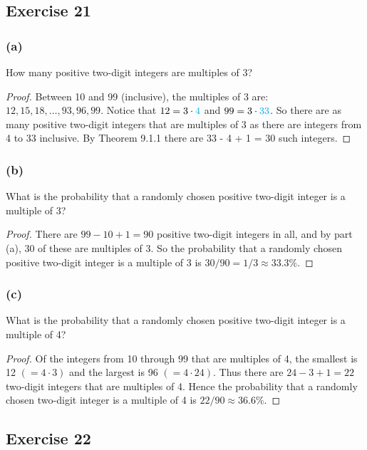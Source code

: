 \documentclass[14pt]{extarticle}
\newcommand{\cy}{\color{cyan}}
\begin{document}
\subsection{Exercise 21}
\subsubsection{(a)}
How many positive two-digit integers are multiples of 3?

\begin{proof}
Between 10 and 99 (inclusive), the multiples of 3 are: \(12, 15, 18, \ldots, 93, 96, 99\). Notice that
\(12 = 3 \cdot {\cy 4}\) and \(99 = 3 \cdot {\cy 33}\). So there are as many positive two-digit integers that are 
multiples of 3 as there are integers from 4 to 33 inclusive. By Theorem 9.1.1 there are 33 - 4 + 1 = 30 such
integers.
\end{proof}

\subsubsection{(b)}
What is the probability that a randomly chosen positive two-digit integer is a multiple of 3?

\begin{proof}
There are \(99 - 10 + 1 = 90\) positive two-digit integers in all, and by part (a), 30 of these are multiples of 3. So 
the probability that a randomly chosen positive two-digit integer is a multiple of 3 is \(30/90=1/3 \approx 33.3\%\).
\end{proof}

\subsubsection{(c)}
What is the probability that a randomly chosen positive two-digit integer is a multiple of 4?

\begin{proof}
Of the integers from 10 through 99 that are multiples of 4, the smallest is 12 \((= 4 \cdot 3)\) and the largest is 96 
\((= 4 \cdot 24)\). Thus there are \(24 - 3 + 1 = 22\) two-digit integers that are multiples of 4. Hence the 
probability that a randomly chosen two-digit integer is a multiple of 4 is \(22/90 \approx 36.6\%\).
\end{proof}

\subsection{Exercise 22}
\end{document}
